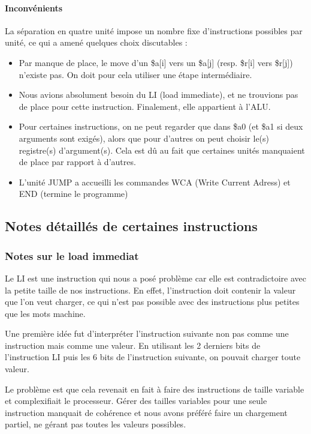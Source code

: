 \documentclass{article}
\begin{document}
\paragraph{Inconvénients}
La séparation en quatre unité impose un nombre fixe d'instructions possibles
par unité, ce qui a amené quelques choix discutables :
\begin{itemize}
  \item Par manque de place, le move d'un \$a[i] vers un \$a[j]
    (resp. \$r[i] vers \$r[j]) n'existe pas. On doit pour cela utiliser une
    étape intermédiaire.
  \item Nous avions absolument besoin du LI (load immediate), et ne trouvions
    pas de place pour cette instruction. Finalement, elle appartient à l'ALU.
  \item Pour certaines instructions, on ne peut regarder que dans \$a0 (et \$a1
    si deux arguments sont exigés), alors que pour d'autres on peut choisir
    le(s) registre(s) d'argument(s). Cela est dû au fait que certaines unités
    manquaient de place par rapport à d'autres.
  \item L'unité JUMP a accueilli les commandes WCA (Write Current Adress) et
    END (termine le programme)
\end{itemize}

\subsection{Notes détaillés de certaines instructions}

\subsubsection{Notes sur le load immediat}
Le LI est une instruction qui nous a posé problème car elle est contradictoire
avec la petite taille de nos instructions. En effet, l'instruction doit contenir
la valeur que l'on veut charger, ce qui n'est pas possible avec des instructions
plus petites que les mots machine.

Une première idée fut d'interpréter l'instruction suivante non pas comme une
instruction mais comme une valeur. En utilisant les 2 derniers bits de l'instruction
LI puis les 6 bits de l'instruction suivante, on pouvait charger toute valeur.

Le problème est que cela revenait en fait à faire des instructions de taille variable
et complexifiait le processeur. Gérer des tailles variables pour une seule instruction
manquait de cohérence et nous avons préféré faire un chargement partiel, ne gérant
pas toutes les valeurs possibles.
\end{document}
